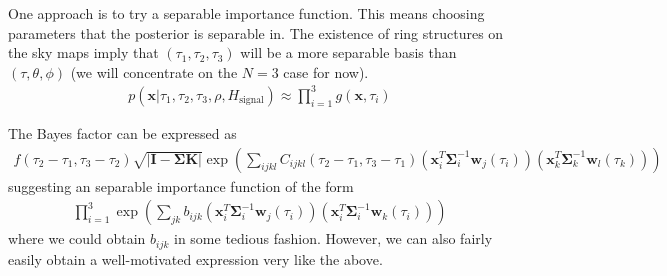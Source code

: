 \documentclass{article}
\begin{document}
One approach is to try a separable importance function.  This means choosing parameters that the posterior is separable in.  The existence of ring structures on the sky maps imply that $(\tau_1, \tau_2, \tau_3)$ will be a more separable basis than $(\tau, \theta, \phi)$ (we will concentrate on the $N=3$ case for now).
\begin{eqnarray}
p(\mathbf{x}|\tau_1,\tau_2,\tau_3,\rho,H_\textrm{signal}) \approx \prod_{i=1}^3 g(\mathbf{x},\tau_i)
\end{eqnarray}

The Bayes factor can be expressed as
\begin{eqnarray}
f(\tau_2-\tau_1,\tau_3-\tau_2)
\sqrt{|\mathbf{I}-\mathbf{\Sigma K}|}\exp(\sum_{ijkl}C_{ijkl}(\tau_2-\tau_1,\tau_3-\tau_1)(\mathbf{x}_i^T\mathbf{\Sigma}^{-1}_i\mathbf{w}_j(\tau_i))(\mathbf{x}_k^T\mathbf{\Sigma}^{-1}_k\mathbf{w}_l(\tau_k)))
\end{eqnarray}
suggesting an separable importance function of the form
\begin{eqnarray}
\prod_{i=1}^3\exp(\sum_{jk} b_{ijk} (\mathbf{x}_i^T\mathbf{\Sigma}^{-1}_i\mathbf{w}_j(\tau_i))(\mathbf{x}_i^T\mathbf{\Sigma}^{-1}_i\mathbf{w}_k(\tau_i)))
\end{eqnarray}
where we could obtain $b_{ijk}$ in some tedious fashion.  However, we can also fairly easily obtain a well-motivated expression very like the above.
\end{document}
